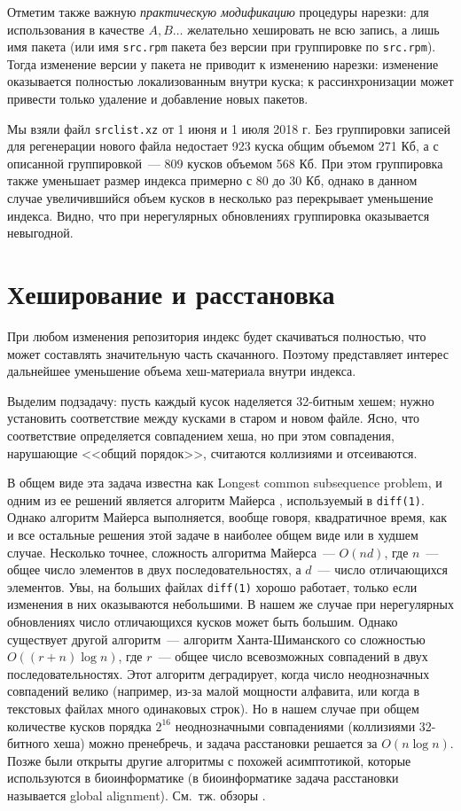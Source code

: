 \documentclass[russian,a4paper,12pt]{article}
\begin{document}
Отметим также важную \textit{практическую модификацию} процедуры нарезки: для использования в качестве $A, B\ldots$
желательно хешировать не всю запись, а лишь имя пакета (или имя \verb|src.rpm| пакета без версии при группировке по \verb|src.rpm|).
Тогда изменение версии у пакета не приводит к изменению нарезки: изменение оказывается полностью локализованным внутри куска;
к рассинхронизации может привести только удаление и добавление новых пакетов.

Мы взяли файл \verb|srclist.xz| от 1 июня и 1 июля 2018 г.  Без группировки записей для регенерации нового файла
недостает 923 куска общим объемом 271 Кб, а с описанной группировкой~--- 809 кусков объемом 568 Кб.  При этом группировка
также уменьшает размер индекса примерно с 80 до 30 Кб, однако в данном случае увеличившийся объем кусков в несколько
раз перекрывает уменьшение индекса.  Видно, что при нерегулярных обновлениях группировка оказывается невыгодной.

\section{Хеширование и расстановка}
При любом изменения репозитория индекс будет скачиваться полностью, что может составлять значительную часть скачанного.
Поэтому представляет интерес дальнейшее уменьшение объема хеш-материала внутри индекса.

Выделим подзадачу: пусть каждый кусок наделяется 32-битным хешем; нужно установить соответствие между кусками в старом
и новом файле.  Ясно, что соответствие определяется совпадением хеша, но при этом совпадения, нарушающие <<общий порядок>>,
считаются коллизиями и отсеиваются.

В общем виде эта задача известна как Longest common subsequence problem, и одним из ее решений является алгоритм Майерса
\cite{myers}, используемый в \verb|diff(1)|.  Однако алгоритм Майерса выполняется, вообще говоря, квадратичное время,
как и все остальные решения этой задаче в наиболее общем виде или в худшем случае.  Несколько точнее, сложность алгоритма Майерса~---
$O(nd)$, где $n$~--- общее число элементов в двух последовательностях, а $d$~--- число отличающихся элементов.
Увы, на больших файлах \verb|diff(1)| хорошо работает, только если изменения в них оказываются небольшими.
В нашем же случае при нерегулярных обновлениях число отличающихся кусков может быть большим.
Однако существует другой алгоритм~--- алгоритм Ханта-Шиманского со сложностью $O((r+n)\log n)$, где $r$~--- общее число
всевозможных совпадений в двух последовательностях.  Этот алгоритм деградирует, когда число неоднозначных совпадений велико
(например, из-за малой мощности алфавита, или когда в текстовых файлах много одинаковых строк).  Но в нашем случае при общем
количестве кусков порядка $2^{16}$ неоднозначными совпадениями (коллизиями 32-битного хеша) можно пренебречь, и задача расстановки
решается за $O(n\log n)$.  Позже были открыты другие алгоритмы с похожей асимптотикой, которые используются в биоинформатике
\cite[с.\,291]{seq} (в биоинформатике задача расстановки называется global alignment).  См.~тж. обзоры \cite{survey,symposium}.
\end{document}
